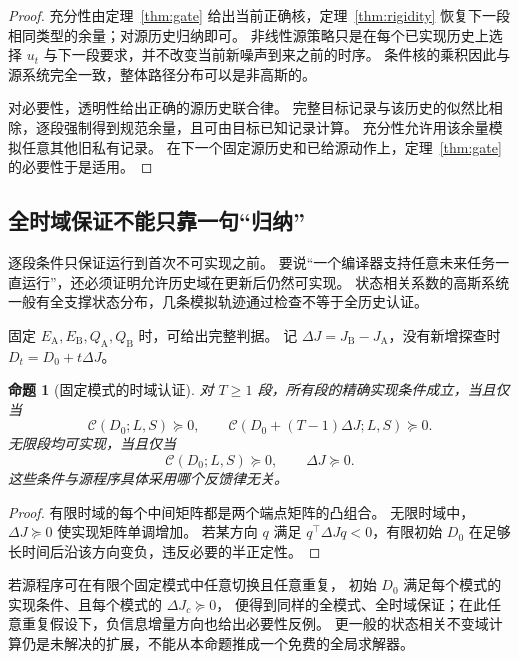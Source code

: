 \documentclass[UTF8,fontset=fandol,11pt,a4paper]{ctexart}
\newtheorem{proposition}[theorem]{命题}
\theoremstyle{definition}
\theoremstyle{remark}
\numberwithin{equation}{section}
\begin{document}
\begin{proof}
充分性由定理~\ref{thm:gate} 给出当前正确核，定理~\ref{thm:rigidity} 恢复下一段相同类型的余量；对源历史归纳即可。
非线性源策略只是在每个已实现历史上选择 $u_t$ 与下一段要求，并不改变当前新噪声到来之前的时序。
条件核的乘积因此与源系统完全一致，整体路径分布可以是非高斯的。

对必要性，透明性给出正确的源历史联合律。
完整目标记录与该历史的似然比相除，逐段强制得到规范余量，且可由目标已知记录计算。
充分性允许用该余量模拟任意其他旧私有记录。
在下一个固定源历史和已给源动作上，定理~\ref{thm:gate} 的必要性于是适用。
\end{proof}

\subsection{全时域保证不能只靠一句“归纳”}
逐段条件只保证运行到首次不可实现之前。
要说“一个编译器支持任意未来任务一直运行”，还必须证明允许历史域在更新后仍然可实现。
状态相关系数的高斯系统一般有全支撑状态分布，几条模拟轨迹通过检查不等于全历史认证。

固定 $E_{\mathrm A},E_{\mathrm B},Q_{\mathrm A},Q_{\mathrm B}$ 时，可给出完整判据。
记 $\Delta J=J_{\mathrm B}-J_{\mathrm A}$，没有新增探查时 $D_t=D_0+t\Delta J$。

\begin{proposition}[固定模式的时域认证]
\label{prop:horizon}
对 $T\ge1$ 段，所有段的精确实现条件成立，当且仅当
\begin{equation}
 \mathcal C(D_0;L,S)\succeq0,\qquad
 \mathcal C(D_0+(T-1)\Delta J;L,S)\succeq0.
\end{equation}
无限段均可实现，当且仅当
\begin{equation}
 \mathcal C(D_0;L,S)\succeq0,\qquad \Delta J\succeq0.
\end{equation}
这些条件与源程序具体采用哪个反馈律无关。
\end{proposition}
\begin{proof}
有限时域的每个中间矩阵都是两个端点矩阵的凸组合。
无限时域中，$\Delta J\succeq0$ 使实现矩阵单调增加。
若某方向 $q$ 满足 $q^\top\Delta Jq<0$，有限初始 $D_0$ 在足够长时间后沿该方向变负，违反必要的半正定性。
\end{proof}

若源程序可在有限个固定模式中任意切换且任意重复，
初始 $D_0$ 满足每个模式的实现条件、且每个模式的 $\Delta J_c\succeq0$，
便得到同样的全模式、全时域保证；在此任意重复假设下，负信息增量方向也给出必要性反例。
更一般的状态相关不变域计算仍是未解决的扩展，不能从本命题推成一个免费的全局求解器。
\end{document}
